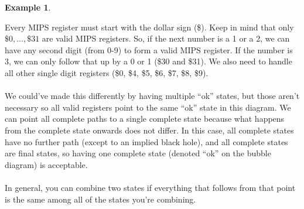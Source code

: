 \documentclass[]{article}
\theoremstyle{definition}
\newtheorem{ex}{Example}[section]
\begin{document}
\begin{ex}
\begin{center}
					\end{center}
					
					Every MIPS register must start with the dollar sign (\$). Keep in mind that only $\$0, \ldots, \$31$ are valid MIPS registers. So, if the next number is a 1 or a 2, we can have any second digit (from 0-9) to form a valid MIPS register. If the number is 3, we can only follow that up by a 0 or 1 (\$30 and \$31). We also need to handle all other single digit registers (\$0, \$4, \$5, \$6, \$7, \$8, \$9).
					\\ \\
					We could've made this differently by having multiple ``ok'' states, but those aren't necessary so all valid registers point to the same ``ok'' state in this diagram. We can point all complete paths to a single complete state because what happens from the complete state onwards does not differ. In this case, all complete states have no further path (except to an implied black hole), and all complete states are final states, so having one complete state (denoted ``ok'' on the bubble diagram) is acceptable.
					\\ \\
					In general, you can combine two states if everything that follows from that point is the same among all of the states you're combining.
				\end{ex}
\end{document}
